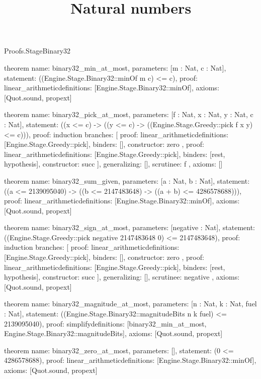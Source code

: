\begin{lexlean}{Proofs.StageBinary32}
\title{Natural numbers}
\begin{semanticmodule}
theorem{
  name: binary32_min_at_most,
  parameters: [m : Nat, c : Nat],
  statement: ((Engine.Stage.Binary32::minOf m c) <= c),
  proof: linear_arithmetic{definitions: [Engine.Stage.Binary32::minOf]},
  axioms: [Quot.sound, propext]
}

theorem{
  name: binary32_pick_at_most,
  parameters: [f : Nat, x : Nat, y : Nat, c : Nat],
  statement: ((x <= c) -> ((y <= c) -> ((Engine.Stage.Greedy::pick f x y) <= c))),
  proof: induction{
    branches: [
      {
        proof: linear_arithmetic{definitions: [Engine.Stage.Greedy::pick]},
        binders: [],
        constructor: zero
      },
      {
        proof: linear_arithmetic{definitions: [Engine.Stage.Greedy::pick]},
        binders: [rest, hypothesis],
        constructor: succ
      }
    ],
    generalizing: [],
    scrutinee: f
  },
  axioms: []
}

theorem{
  name: binary32_sum_given,
  parameters: [a : Nat, b : Nat],
  statement: ((a <= 2139095040) -> ((b <= 2147483648) -> ((a + b) <= 4286578688))),
  proof: linear_arithmetic{definitions: [Engine.Stage.Binary32::minOf]},
  axioms: [Quot.sound, propext]
}

theorem{
  name: binary32_sign_at_most,
  parameters: [negative : Nat],
  statement: ((Engine.Stage.Greedy::pick negative 2147483648 0) <= 2147483648),
  proof: induction{
    branches: [
      {
        proof: linear_arithmetic{definitions: [Engine.Stage.Greedy::pick]},
        binders: [],
        constructor: zero
      },
      {
        proof: linear_arithmetic{definitions: [Engine.Stage.Greedy::pick]},
        binders: [rest, hypothesis],
        constructor: succ
      }
    ],
    generalizing: [],
    scrutinee: negative
  },
  axioms: [Quot.sound, propext]
}

theorem{
  name: binary32_magnitude_at_most,
  parameters: [n : Nat, k : Nat, fuel : Nat],
  statement: ((Engine.Stage.Binary32::magnitudeBits n k fuel) <= 2139095040),
  proof: simplify{definitions: [binary32_min_at_most, Engine.Stage.Binary32::magnitudeBits]},
  axioms: [Quot.sound, propext]
}

theorem{
  name: binary32_zero_at_most,
  parameters: [],
  statement: (0 <= 4286578688),
  proof: linear_arithmetic{definitions: [Engine.Stage.Binary32::minOf]},
  axioms: [Quot.sound, propext]
}


\end{semanticmodule}
\end{lexlean}
